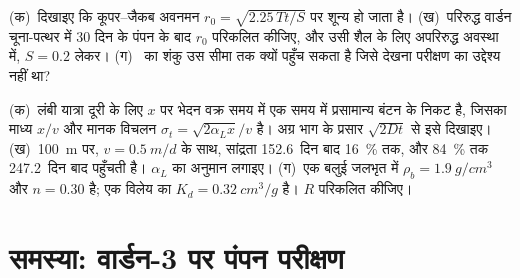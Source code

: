 \begin{exercise}[$\star\star\star$]\label{exo:b3:hydrogeology:11}
(क)~दिखाइए कि कूपर--जैकब अवनमन $r_0 =
\sqrt{2.25\,Tt/S}$ पर शून्य हो जाता है। (ख)~परिरुद्ध वार्डन चूना-पत्थर में 30 दिन के पंपन के बाद $r_0$
परिकलित कीजिए, और उसी शैल के लिए अपरिरुद्ध अवस्था में, $S =
0.2$ लेकर। (ग)~ का शंकु उस सीमा तक क्यों पहुँच सकता है
जिसे देखना परीक्षण का उद्देश्य नहीं था?
\end{exercise}

\begin{exercise}[$\star\star\star$]\label{exo:b3:hydrogeology:12}
(क)~लंबी यात्रा दूरी के लिए $x$ पर भेदन वक्र समय में एक
समय में प्रसामान्य बंटन के निकट है, जिसका माध्य $x/v$ और मानक विचलन $\sigma_t
= \sqrt{2\alpha_Lx}/v$ है। अग्र भाग के प्रसार $\sqrt{2Dt}$ से इसे दिखाइए।
(ख)~\qty{100}{m} पर, $v = \qty{0.5}{m/d}$ के साथ, सांद्रता
\num{152.6}~दिन बाद \qty{16}{\percent} तक, और
\qty{84}{\percent} तक \num{247.2}~दिन बाद पहुँचती है। $\alpha_L$ का अनुमान लगाइए। (ग)~एक बलुई जलभृत में $\rho_b =
\qty{1.9}{g/cm^3}$ और $n = 0.30$ है; एक विलेय का $K_d =
\qty{0.32}{cm^3/g}$ है। $R$ परिकलित कीजिए।
\end{exercise}

\section{समस्या: वार्डन-3 पर पंपन परीक्षण}

